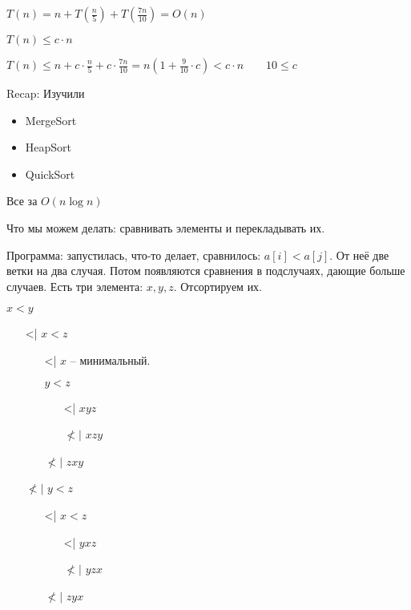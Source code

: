 \documentclass{book}
\theoremstyle{definition}
\begin{document}
    $T(n) = n + T(\frac{n}{5}) + T(\frac{7n}{10}) = O(n)$

    $T(n)\leqslant c\cdot n$

    $T(n)\leqslant n + c\cdot \frac{n}{5} + c\cdot \frac{7n}{10} = n\left( 1+\frac{9}{10}\cdot c \right) <c\cdot n\qquad 10\leqslant c$


    Recap: Изучили
    \begin{itemize}
        \item MergeSort
        \item HeapSort
        \item QuickSort
    \end{itemize}

    Все за $O(n\log n)$

    Что мы можем делать: сравнивать элементы и перекладывать их.

    Программа: запустилась, что-то делает, сравнилось: $a[i]<a[j]$. От неё две ветки на два случая. Потом появляются сравнения в подслучаях, дающие больше случаев.
\newpage
    Есть три элемента: $x, y, z$. Отсортируем их.

     $x<y$
      \begin{itemize}
          \item [<|] $x<z$
               \begin{itemize}
                   \item [<|] $x$ -- минимальный.

                       $y<z$
                        \begin{itemize}
                            \item [<|] $xyz$
                            \item [$\not <|$] $xzy$
                       \end{itemize}
                   \item [$\not <|$] $zxy$
              \end{itemize}
          \item [$\not <|$] $y<z$
              \begin{itemize}
                  \item [<|] $x<z$
                       \begin{itemize}
                           \item [<|] $yxz$
                           \item [$\not <|$]  $yzx$
                      \end{itemize}
                  \item [$\not <|$] $zyx$
              \end{itemize}

     \end{itemize}
\end{document}
